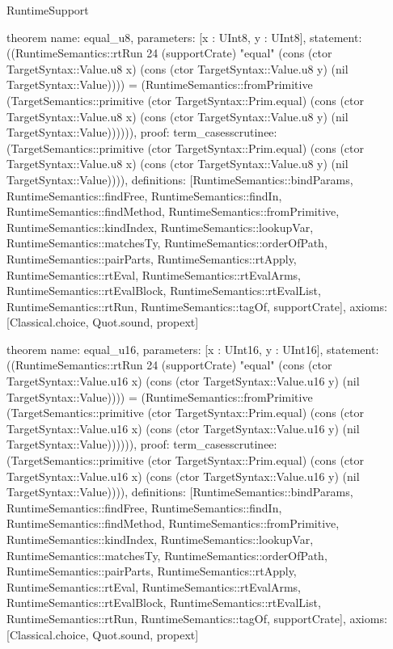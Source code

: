\begin{lexlean}{RuntimeSupport}
\begin{semanticmodule}
theorem{
  name: equal_u8,
  parameters: [x : UInt8, y : UInt8],
  statement: ((RuntimeSemantics::rtRun 24 (supportCrate) "equal" (cons (ctor TargetSyntax::Value.u8 x) (cons (ctor TargetSyntax::Value.u8 y) (nil TargetSyntax::Value)))) = (RuntimeSemantics::fromPrimitive (TargetSemantics::primitive (ctor TargetSyntax::Prim.equal) (cons (ctor TargetSyntax::Value.u8 x) (cons (ctor TargetSyntax::Value.u8 y) (nil TargetSyntax::Value)))))),
  proof: term_cases{scrutinee: (TargetSemantics::primitive (ctor TargetSyntax::Prim.equal) (cons (ctor TargetSyntax::Value.u8 x) (cons (ctor TargetSyntax::Value.u8 y) (nil TargetSyntax::Value)))), definitions: [RuntimeSemantics::bindParams, RuntimeSemantics::findFree, RuntimeSemantics::findIn, RuntimeSemantics::findMethod, RuntimeSemantics::fromPrimitive, RuntimeSemantics::kindIndex, RuntimeSemantics::lookupVar, RuntimeSemantics::matchesTy, RuntimeSemantics::orderOfPath, RuntimeSemantics::pairParts, RuntimeSemantics::rtApply, RuntimeSemantics::rtEval, RuntimeSemantics::rtEvalArms, RuntimeSemantics::rtEvalBlock, RuntimeSemantics::rtEvalList, RuntimeSemantics::rtRun, RuntimeSemantics::tagOf, supportCrate]},
  axioms: [Classical.choice, Quot.sound, propext]
}

theorem{
  name: equal_u16,
  parameters: [x : UInt16, y : UInt16],
  statement: ((RuntimeSemantics::rtRun 24 (supportCrate) "equal" (cons (ctor TargetSyntax::Value.u16 x) (cons (ctor TargetSyntax::Value.u16 y) (nil TargetSyntax::Value)))) = (RuntimeSemantics::fromPrimitive (TargetSemantics::primitive (ctor TargetSyntax::Prim.equal) (cons (ctor TargetSyntax::Value.u16 x) (cons (ctor TargetSyntax::Value.u16 y) (nil TargetSyntax::Value)))))),
  proof: term_cases{scrutinee: (TargetSemantics::primitive (ctor TargetSyntax::Prim.equal) (cons (ctor TargetSyntax::Value.u16 x) (cons (ctor TargetSyntax::Value.u16 y) (nil TargetSyntax::Value)))), definitions: [RuntimeSemantics::bindParams, RuntimeSemantics::findFree, RuntimeSemantics::findIn, RuntimeSemantics::findMethod, RuntimeSemantics::fromPrimitive, RuntimeSemantics::kindIndex, RuntimeSemantics::lookupVar, RuntimeSemantics::matchesTy, RuntimeSemantics::orderOfPath, RuntimeSemantics::pairParts, RuntimeSemantics::rtApply, RuntimeSemantics::rtEval, RuntimeSemantics::rtEvalArms, RuntimeSemantics::rtEvalBlock, RuntimeSemantics::rtEvalList, RuntimeSemantics::rtRun, RuntimeSemantics::tagOf, supportCrate]},
  axioms: [Classical.choice, Quot.sound, propext]
}


\end{semanticmodule}
\end{lexlean}
